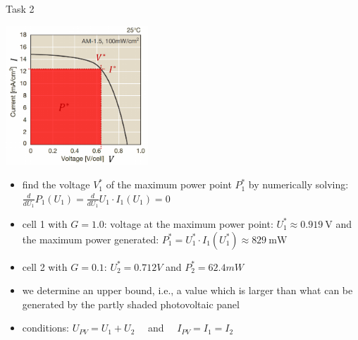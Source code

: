 \begin{frame}[allowframebreaks]{Task 2}{}
\begin{tasknoinc}
  \end{tasknoinc}
  \begin{requirementsnoinc}
    \centering
    \includegraphics[width=0.4\textwidth]{./figures/task2_sweetspot.png}
  \end{requirementsnoinc}
  \begin{solutionnoinc}
    \begin{itemize}
      \item find the \alert{voltage} $V_1^*$ of the \alert{maximum power point} $P_1^*$ by numerically solving: $\displaystyle\frac{d}{d U_1} P_1\left(U_1\right)=\frac{d}{d U_1} U_1 \cdot I_1\left(U_1\right)=0$
      \item cell 1 with $G=1.0$: voltage at the maximum power point: $U_1^* \approx 0.919 \mathrm{~V}$ and the maximum power generated: $P_1^*=U_1^* \cdot I_1\left(U_1^*\right) \approx 829 \mathrm{~mW}$
      \item cell 2 with $G=0.1$: $U_2^*=0.712V$ and $P_2^*=62.4mW$
      \item  we determine an upper bound, i.e., a value which is larger than what can be generated by the partly shaded photovoltaic panel
      \item conditions: $U_{P V}=U_1+U_2 \quad$ and $\quad I_{P V}=I_1=I_2$
    \end{itemize}
  \end{solutionnoinc}
  \begin{solutionnoinc}
\end{solutionnoinc}
\end{frame}

